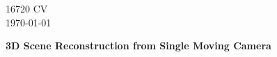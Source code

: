 \documentclass[11pt]{article}
\begin{document}
\begin{flushleft}
16720 CV\\
\today
\end{flushleft}


\begin{center}
\begin{Large}
\textbf{3D Scene Reconstruction from Single Moving Camera}
\end{Large}
\end{center}









\clearpage


\end{document}
